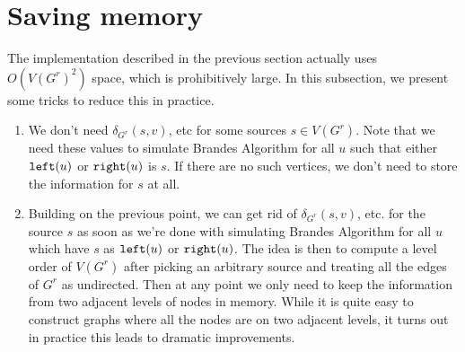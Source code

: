 \section{Saving memory}
The implementation described in the previous section actually uses
$O(V(G^r)^2)$ space, which is prohibitively large.
In this subsection, we present some tricks to reduce this in practice.

\begin{enumerate}[I]
\item
	We don't need $\delta_{G^r}(s, v)$, etc for some sources $s \in V(G^r)$.
	Note that we need these values to simulate Brandes Algorithm for all $u$
	such that either $\texttt{left}(u)$ or $\texttt{right}(u)$ is $s$.
	If there are no such vertices, we don't need to store the information
	for $s$ at all.
\item
	Building on the previous point, we can get rid of $\delta_{G^r}(s, v)$, etc.
	for the source $s$ as soon as we're done with simulating Brandes Algorithm
	for all $u$ which have $s$ as $\texttt{left}(u)$ or $\texttt{right}(u)$.
	The idea is then to compute a level order of $V(G^r)$ after picking an
	arbitrary source and treating all the edges of $G^r$ as undirected.
	Then at any point we only need to keep the information from two adjacent
	levels of nodes in memory.
	While it is quite easy to construct graphs where all the nodes are on two
	adjacent levels, it turns out in practice this leads to dramatic
	improvements.
\end{enumerate}
